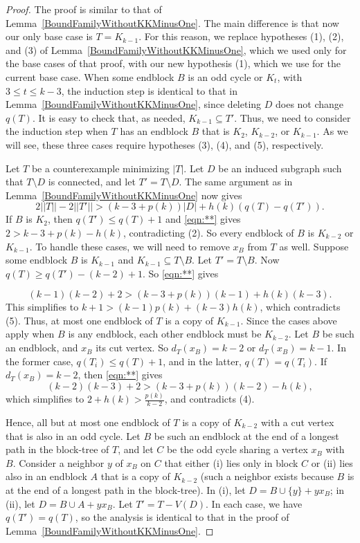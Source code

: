 \documentclass[12pt]{article}
\theoremstyle{plain}
\theoremstyle{definition}
\theoremstyle{remark}
\newcommand{\card}[1]{\left|#1\right|}
\newcommand{\parens}[1]{\left( #1 \right)}
\begin{document}
\begin{proof}

    The proof is similar to that of Lemma~\ref{BoundFamilyWithoutKKMinusOne}.  The main difference is that now our only base case is $T=K_{k-1}$.  For this reason, we replace hypotheses (1), (2), and (3) of Lemma~\ref{BoundFamilyWithoutKKMinusOne}, which we used only for the base cases of that proof, with our new hypothesis (1), which we use for the current base case.  When some endblock $B$ is an odd cycle or $K_t$, with $3\le t\le k-3$, the induction step is identical to that in Lemma~\ref{BoundFamilyWithoutKKMinusOne}, since deleting $D$ does not change $q(T)$.
    It is easy to check that, as needed, $K_{k-1}\subseteq T'$.  Thus, we need to consider the induction step when $T$ has an endblock $B$ that is $K_2$, $K_{k-2}$, or $K_{k-1}$.  As we will see, these three cases require hypotheses (3), (4), and (5), respectively.
    
    Let $T$ be a counterexample minimizing $|T|$.  Let $D$ be an induced subgraph such that $T\setminus D$ is connected, and let $T'=T\setminus D$. The same argument as in Lemma~\ref{BoundFamilyWithoutKKMinusOne} now gives
    \begin{equation}
		2||T||-2||T'|| > (k-3 + p(k))\card{D} + h(k)\parens{q(T) - q(T')}.\tag{*}\label{eqn:**}
	\end{equation}
	If $B$ is $K_2$, then $q(T') \le q(T) + 1$ and \eqref{eqn:**} gives $2 > k-3 + p(k) - h(k)$, contradicting (2).
	So every endblock of $B$ is $K_{k-2}$ or $K_{k-1}$. To handle these cases, we will need to remove $x_B$ from $T$ as well.  Suppose some endblock $B$ is $K_{k-1}$ and $K_{k-1} \subseteq T\setminus B$.  Let $T'=T\setminus B$.  Now $q(T) \ge q(T')-(k-2)+1$.  So \eqref{eqn:**} gives
	
	\[ (k-1)(k-2)+2 > (k-3+p(k))(k-1)+h(k)(k-3).\]
	This simplifies to $k+1 > (k-1)p(k)+(k-3)h(k)$, which contradicts (5).  Thus, at most one endblock of $T$ is a copy of $K_{k-1}$.
	Since the cases above apply when $B$ is any endblock, each other endblock must be $K_{k-2}$.  Let $B$ be such an endblock, and $x_B$ its cut vertex.	So $d_T(x_{B}) = k - 2$ or $d_T(x_{B}) = k-1$.  In the former case, $q(T_i) \le q(T) + 1$, and in the latter, $q(T) = q(T_i)$.
	If $d_T(x_{B}) = k - 2$, then \eqref{eqn:**} gives
	\[(k-2)(k-3) +2 > (k-3 + p(k))(k-2) - h(k),\]
	which simplifies to $2+h(k) > \frac{p(k)}{k-2}$, and contradicts (4).
	
	Hence, all but at most one endblock of $T$ is a copy of $K_{k-2}$ with a cut vertex that is also in an odd cycle.  Let $B$ be such an endblock 
	at the end of a longest path in the block-tree of $T$, and let $C$ be the odd cycle sharing a vertex $x_B$ with $B$.  Consider a neighbor $y$ 
	of $x_B$ on $C$ that either (i) lies only in block $C$ or (ii) lies also in an endblock $A$ that is a copy of $K_{k-2}$ (such a neighbor exists 
	because $B$ is at the end of a longest path in the block-tree).  In (i), let $D=B\cup\{y\}+yx_B$; in (ii), let $D=B\cup A+yx_B$.  Let 
	$T'=T-V(D)$.	In each case, we have $q(T')=q(T)$, so the analysis is identical to that in the proof of
	Lemma~\ref{BoundFamilyWithoutKKMinusOne}.
\end{proof}
\end{document}
